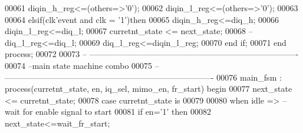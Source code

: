\begin{DoxyCode}
00061         \textcolor{vhdlchar}{diqin_h_reg}\textcolor{vhdlchar}{<=}\textcolor{vhdlchar}{(}\textcolor{keywordflow}{others}\textcolor{vhdlchar}{=}\textcolor{vhdlchar}{>}\textcolor{vhdlchar}{'}\textcolor{vhdllogic}{}\textcolor{vhdllogic}{0}\textcolor{vhdlchar}{'}\textcolor{vhdlchar}{)};
00062         \textcolor{vhdlchar}{diqin_l_reg}\textcolor{vhdlchar}{<=}\textcolor{vhdlchar}{(}\textcolor{keywordflow}{others}\textcolor{vhdlchar}{=}\textcolor{vhdlchar}{>}\textcolor{vhdlchar}{'}\textcolor{vhdllogic}{}\textcolor{vhdllogic}{0}\textcolor{vhdlchar}{'}\textcolor{vhdlchar}{)};
00063 
00064     \textcolor{keywordflow}{elsif}\textcolor{vhdlchar}{(}\textcolor{vhdlchar}{clk}\textcolor{vhdlchar}{'}\textcolor{vhdlkeyword}{event} \textcolor{keywordflow}{and} \textcolor{vhdlchar}{clk} \textcolor{vhdlchar}{=} \textcolor{vhdlchar}{'}\textcolor{vhdllogic}{}\textcolor{vhdllogic}{1}\textcolor{vhdlchar}{'}\textcolor{vhdlchar}{)}\textcolor{keywordflow}{then} 
00065         \textcolor{vhdlchar}{diqin_h_reg}\textcolor{vhdlchar}{<=}\textcolor{vhdlchar}{diq_h};
00066         \textcolor{vhdlchar}{diqin_l_reg}\textcolor{vhdlchar}{<=}\textcolor{vhdlchar}{diq_l};
00067         \textcolor{vhdlchar}{curretnt_state} \textcolor{vhdlchar}{<=} \textcolor{vhdlchar}{next_state};
00068 \textcolor{keyword}{        --diq\_l\_reg<=diq\_l;}
00069         \textcolor{vhdlchar}{diq_l_reg}\textcolor{vhdlchar}{<=}\textcolor{vhdlchar}{diqin_l_reg};
00070     \textcolor{keywordflow}{end} \textcolor{keywordflow}{if}; 
00071 \textcolor{keywordflow}{end} \textcolor{keywordflow}{process};
00072 
00073 \textcolor{keyword}{-- ----------------------------------------------------------------------------}
00074 \textcolor{keyword}{--main state machine combo}
00075 \textcolor{keyword}{-- ----------------------------------------------------------------------------}
00076 main\_fsm : \textcolor{keywordflow}{process}(curretnt_state, en, iq_sel, mimo_en, fr_start) \textcolor{keywordflow}{begin}
00077     \textcolor{vhdlchar}{next_state} \textcolor{vhdlchar}{<=} \textcolor{vhdlchar}{curretnt_state};
00078     \textcolor{keywordflow}{case} \textcolor{vhdlchar}{curretnt_state} \textcolor{keywordflow}{is}
00079     
00080         \textcolor{keywordflow}{when} \textcolor{vhdlchar}{idle} \textcolor{vhdlchar}{=}\textcolor{vhdlchar}{>}\textcolor{keyword}{                    --wait for enable signal to start}
00081             \textcolor{keywordflow}{if} \textcolor{vhdlchar}{en}\textcolor{vhdlchar}{=}\textcolor{vhdlchar}{'}\textcolor{vhdllogic}{}\textcolor{vhdllogic}{1}\textcolor{vhdlchar}{'} \textcolor{keywordflow}{then} 
00082                 \textcolor{vhdlchar}{next_state}\textcolor{vhdlchar}{<=}\textcolor{vhdlchar}{wait\_fr\_start};

\end{DoxyCode}
